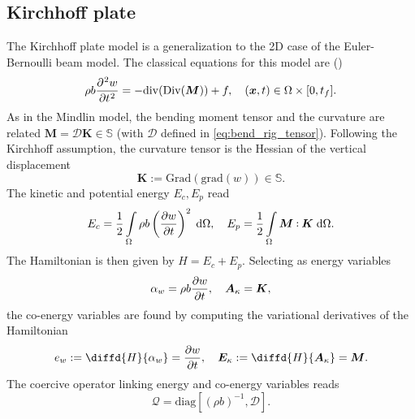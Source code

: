 \documentclass{ifacconf}
\def\onedot{$\mathsurround0pt\ldotp$}
\def\cddot{%
	\mathbin{\vcenter{\baselineskip.67ex
			\hbox{\onedot}\hbox{\onedot}}%
}}
\begin{document}
\subsection{Kirchhoff plate}
The Kirchhoff plate model is a generalization to the 2D case of the Euler-Bernoulli beam model. The classical equations for this model are (\cite{timoshenko1959theory}) 
\begin{equation}
\label{eq:clKir}
\displaystyle \rho b \diffp[2]{w}{t} = -\mathrm{div}(\mathrm{Div}(\bm{M})) + f, \quad (\bm{x}, t) \in \Omega \times [0, t_f].
\end{equation}
As in the Mindlin model, the bending moment tensor and the curvature are related $\bm{M} = \mathcal{D} \bm{K} \in \mathbb{S}$ (with $\mathcal{D}$ defined in \eqref{eq:bend_rig_tensor}). Following the Kirchhoff assumption, the curvature tensor is the Hessian of the vertical displacement
\begin{equation*}
\bm{K} := \mathrm{Grad}(\mathrm{grad}(w)) \in \mathbb{S}.
\end{equation*}
 The kinetic and potential energy $E_c, E_p$ read
\begin{equation}
E_c =  \frac{1}{2} \int_{\Omega} \rho b \left(\diffp{w}{t} \right)^2 \d\Omega, \quad
E_p = \frac{1}{2} \int_{\Omega} \bm{M} \cddot \bm{K} \d\Omega.
\end{equation} 
The Hamiltonian is then given by $H=E_c + E_p$. Selecting as energy variables
\begin{equation}
\alpha_w = \rho b \diffp{w}{t}, \quad \bm{A}_{\kappa} = \bm{K}, 
\end{equation}
the co-energy variables are found by computing the variational derivatives of the Hamiltonian
\begin{equation}
e_w := \diffd{H}{\alpha_w} = \diffp{w}{t}, \quad \bm{E}_{\kappa} := \diffd{H}{\bm{A}_{\kappa}} = \bm{M}. \\
\end{equation}
The coercive operator linking energy and co-energy variables reads
\begin{equation}
\mathcal{Q} = \mathrm{diag}[(\rho b)^{-1}, \mathcal{D}].
\end{equation}
 
\end{document}
